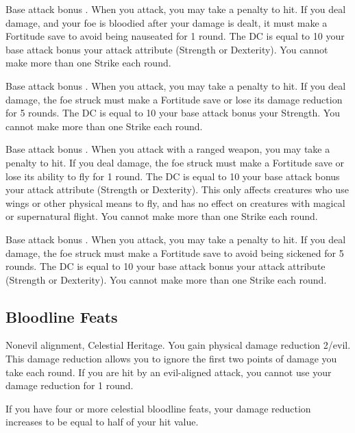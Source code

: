 \featpre Base attack bonus .
\featben When you attack, you may take a  penalty to hit. If you deal damage, and your foe is bloodied after your damage is dealt, it must make a Fortitude save to avoid being nauseated for 1 round. The DC is equal to 10 \add your base attack bonus \add your attack attribute (Strength or Dexterity). You cannot make more than one Strike each round.

\featpre Base attack bonus .
\featben When you attack, you may take a  penalty to hit. If you deal damage, the foe struck must make a Fortitude save or lose its damage reduction for 5 rounds. The DC is equal to 10 \add your base attack bonus \add your Strength. You cannot make more than one Strike each round.

\featpre Base attack bonus .
\featben When you attack with a ranged weapon, you may take a  penalty to hit. If you deal damage, the foe struck must make a Fortitude save or lose its ability to fly for 1 round. The DC is equal to 10 \add your base attack bonus \add your attack attribute (Strength or Dexterity). This only affects creatures who use wings or other physical means to fly, and has no effect on creatures with magical or supernatural flight. You cannot make more than one Strike each round.

\featpre Base attack bonus .
\featben When you attack, you may take a  penalty to hit. If you deal damage, the foe struck must make a Fortitude save to avoid being sickened for 5 rounds. The DC is equal to 10 \add your base attack bonus \add your attack attribute (Strength or Dexterity). You cannot make more than one Strike each round.

\subsection{Bloodline Feats}

 Nonevil alignment, Celestial Heritage.
 You gain physical damage reduction 2/evil. This damage reduction allows you to ignore the first two points of damage you take each round. If you are hit by an evil-aligned attack, you cannot use your damage reduction for 1 round.

If you have four or more celestial bloodline feats, your damage reduction increases to be equal to half of your hit value.

